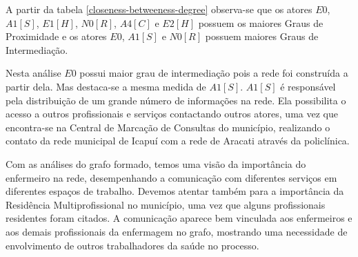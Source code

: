 A partir da tabela \ref{closeness-betweeness-degree} observa-se que os atores $E0$, $A1 [S]$, $E1 [H]$, $N0 [R]$, $A4 [C]$ e $E2 [H]$ possuem os maiores Graus de Proximidade e os atores $E0$, $A1 [S]$ e $N0 [R]$ possuem maiores Graus de Intermediação.

Nesta análise $E0$ possui maior grau de intermediação pois a rede foi construída a partir dela. Mas destaca-se a mesma medida de $A1[S]$. $A1[S]$ é responsável pela distribuição de um grande número de informações na rede. Ela possibilita o acesso a outros profissionais e serviços contactando outros atores, uma vez que encontra-se na Central de Marcação de Consultas do município, realizando o contato da rede municipal de Icapuí com a rede de Aracati através da policlínica.

Com as análises do grafo formado, temos uma visão da importância do enfermeiro na rede, desempenhando a comunicação com diferentes serviços em diferentes espaços de trabalho. Devemos atentar também para a importância da Residência Multiprofissional no município, uma vez que alguns profissionais residentes foram citados. A comunicação aparece bem vinculada aos enfermeiros e aos demais profissionais da enfermagem no grafo, mostrando uma necessidade de envolvimento de outros trabalhadores da saúde no processo.